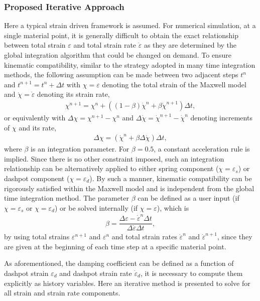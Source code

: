 \subsubsection{Proposed Iterative Approach}
Here a typical strain driven framework is assumed. For numerical simulation, at a single material point, it is generally difficult to obtain the exact relationship between total strain $\varepsilon$ and total strain rate $\dot\varepsilon$ as they are determined by the global integration algorithm that could be changed on demand. To ensure kinematic compatibility, similar to the strategy adopted in many time integration methods, the following assumption can be made between two adjacent steps $t^n$ and $t^{n+1}=t^n+\Delta{}t$ with $\chi=\varepsilon$ denoting the total strain of the Maxwell model and $\dot\chi=\dot\varepsilon$ denoting its strain rate,
\begin{gather}
\chi^{n+1}=\chi^n+\left(\left(1-\beta\right)\dot\chi^n+\beta\dot\chi^{n+1}\right)\Delta{}t,
\end{gather}
or equivalently with $\Delta\chi=\chi^{n+1}-\chi^n$ and $\Delta\dot\chi=\dot\chi^{n+1}-\dot\chi^n$ denoting increments of $\chi$ and its rate,
\begin{gather}\label{eq:newmark2}
\Delta\chi=\left(\dot\chi^n+\beta\Delta\dot\chi\right)\Delta{}t,
\end{gather}
where $\beta$ is an integration parameter. For $\beta=0.5$, a constant acceleration rule is implied. Since there is no other constraint imposed, such an integration relationship can be alternatively applied to either spring component ($\chi=\varepsilon_s$) or dashpot component ($\chi=\varepsilon_d$). By such a manner, kinematic compatibility can be rigorously satisfied within the Maxwell model and is independent from the global time integration method. The parameter $\beta$ can be defined as a user input (if $\chi=\varepsilon_s$ or $\chi=\varepsilon_d$) or be solved internally (if $\chi=\varepsilon$), which is
\begin{gather}\label{eq:delta}
\beta=\dfrac{\Delta\varepsilon-\dot\varepsilon^n\Delta{}t}{\Delta\dot\varepsilon\Delta{}t},
\end{gather}
by using total strains $\varepsilon^{n+1}$ and $\varepsilon^n$ and total strain rates $\dot\varepsilon^n$ and $\dot\varepsilon^{n+1}$, since they are given at the beginning of each time step at a specific material point.

As aforementioned, the damping coefficient can be defined as a function of dashpot strain $\varepsilon_d$ and dashpot strain rate $\dot\varepsilon_d$, it is necessary to compute them explicitly as history variables. Here an iterative method is presented to solve for all strain and strain rate components.

